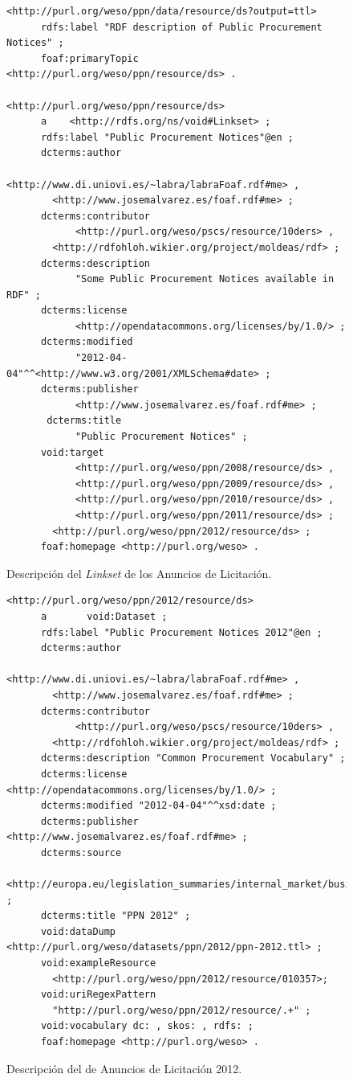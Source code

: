 \begin{figure}[!htp]
\begin{lstlisting} 
<http://purl.org/weso/ppn/data/resource/ds?output=ttl>
      rdfs:label "RDF description of Public Procurement Notices" ;
      foaf:primaryTopic <http://purl.org/weso/ppn/resource/ds> .

<http://purl.org/weso/ppn/resource/ds>
      a    <http://rdfs.org/ns/void#Linkset> ;
      rdfs:label "Public Procurement Notices"@en ;
      dcterms:author 
            <http://www.di.uniovi.es/~labra/labraFoaf.rdf#me> , 
	    <http://www.josemalvarez.es/foaf.rdf#me> ;
      dcterms:contributor
            <http://purl.org/weso/pscs/resource/10ders> ,
	    <http://rdfohloh.wikier.org/project/moldeas/rdf> ;
      dcterms:description 
            "Some Public Procurement Notices available in RDF" ;
      dcterms:license
            <http://opendatacommons.org/licenses/by/1.0/> ;
      dcterms:modified
            "2012-04-04"^^<http://www.w3.org/2001/XMLSchema#date> ;
      dcterms:publisher
            <http://www.josemalvarez.es/foaf.rdf#me> ;
       dcterms:title
            "Public Procurement Notices" ;
      void:target
            <http://purl.org/weso/ppn/2008/resource/ds> , 
            <http://purl.org/weso/ppn/2009/resource/ds> , 
            <http://purl.org/weso/ppn/2010/resource/ds> , 
            <http://purl.org/weso/ppn/2011/resource/ds> ;
	    <http://purl.org/weso/ppn/2012/resource/ds> ;
      foaf:homepage <http://purl.org/weso> .	
\end{lstlisting}
	\caption{Descripción del \textit{Linkset} de los Anuncios de Licitación.}
	\label{fig:ppn-ls}
\end{figure}


\begin{figure}[!htp]
\begin{lstlisting} 
<http://purl.org/weso/ppn/2012/resource/ds>
      a       void:Dataset ;
      rdfs:label "Public Procurement Notices 2012"@en ;
      dcterms:author 
            <http://www.di.uniovi.es/~labra/labraFoaf.rdf#me> , 
	    <http://www.josemalvarez.es/foaf.rdf#me> ;
      dcterms:contributor
            <http://purl.org/weso/pscs/resource/10ders> ,
	    <http://rdfohloh.wikier.org/project/moldeas/rdf> ;
      dcterms:description "Common Procurement Vocabulary" ;
      dcterms:license <http://opendatacommons.org/licenses/by/1.0/> ;
      dcterms:modified "2012-04-04"^^xsd:date ;
      dcterms:publisher <http://www.josemalvarez.es/foaf.rdf#me> ;
      dcterms:source 
	<http://europa.eu/legislation_summaries/internal_market/businesses/public_procurement/l22008_en.htm> ;
      dcterms:title "PPN 2012" ;
      void:dataDump <http://purl.org/weso/datasets/ppn/2012/ppn-2012.ttl> ;
      void:exampleResource
        <http://purl.org/weso/ppn/2012/resource/010357>;
      void:uriRegexPattern
        "http://purl.org/weso/ppn/2012/resource/.+" ;
      void:vocabulary dc: , skos: , rdfs: ;
      foaf:homepage <http://purl.org/weso> .
\end{lstlisting}
	\caption{Descripción del \dataset de Anuncios de Licitación 2012.}
	\label{fig:ppn-ds-2008}
\end{figure}
 

